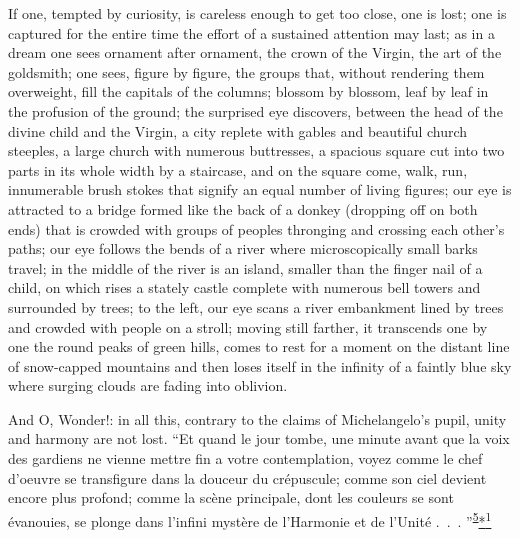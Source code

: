 If one, tempted by curiosity, is careless enough to get too close, one
is lost; one is captured for the entire time the effort of a sustained
attention may last; as in a dream one sees ornament after ornament, the
crown of the Virgin, the art of the goldsmith; one sees, figure by
figure, the groups that, without rendering them overweight, fill the
capitals of the columns; blossom by blossom, leaf by leaf in the
profusion of the ground; the surprised eye discovers, between the head
of the divine child and the Virgin, a city replete with gables and
beautiful church steeples, a large church with numerous buttresses, a
spacious square cut into two parts in its whole width by a staircase,
and on the square come, walk, run, innumerable brush stokes that signify
an equal number of living figures; our eye is attracted to a bridge
formed like the back of a donkey (dropping off on both ends) that is
crowded with groups of peoples thronging and crossing each other's
paths; our eye follows the bends of a river where microscopically small
barks travel; in the middle of the river is an island, smaller than the
finger nail of a child, on which rises a stately castle complete with
numerous bell towers and surrounded by trees; to the left, our eye scans
a river embankment lined by trees and crowded with people on a stroll;
moving still farther, it transcends one by one the round peaks of green
hills, comes to rest for a
\protect\hypertarget{21_Chapter_Thirteen__IMAGE_AND_WORD.xhtmlux5cux23page_335}{}{}moment
on the distant line of snow-capped mountains and then loses itself in
the infinity of a faintly blue sky where surging clouds are fading into
oblivion.

And O, Wonder!: in all this, contrary to the claims of Michelangelo's
pupil, unity and harmony are not lost. ``Et quand le jour tombe, une
minute avant que la voix des gardiens ne vienne mettre fin a votre
contemplation, voyez comme le chef d'oeuvre se transfigure dans la
douceur du crépuscule; comme son ciel devient encore plus profond; comme
la scène principale, dont les couleurs se sont évanouies, se plonge dans
l'infini mystère de l'Harmonie et de l'Unité .~.~.
''\textsuperscript{\protect\hypertarget{21_Chapter_Thirteen__IMAGE_AND_WORD.xhtmlux5cux23id_299}{\protect\hyperlink{23_NOTES.xhtmlux5cux23page_435}{5}}}\protect\hypertarget{21_Chapter_Thirteen__IMAGE_AND_WORD.xhtmlux5cux23id_2353}{\protect\hyperlink{23_NOTES.xhtmlux5cux23id_2354}{*\textsuperscript{1}}}

